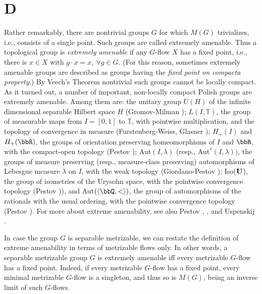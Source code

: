 \section{D}
Rather remarkably, there are nontrivial groups $G$ for which $M(G)$
trivializes, i.e., consists of a single point.  Such groups are called
extremely amenable.  Thus a topological group is {\it extremely
        amenable} if any $G$-flow $X$ has a fixed point, i.e., there is $x\in X$
with $g\cdot x = x,\ \forall g\in G$.  (For this reason, sometimes
extremely amenable groups are described as groups having the {\it fixed
        point on compacta property}.)  By Veech's Theorem nontrivial such
groups cannot be
locally compact.  As it turned out, a number of important, non-locally
compact Polish groups are extremely amenable.  Among them are: the unitary
group $U(H)$ of the infinite dimensional separable Hilbert space $H$
(Gromov-Milman \cite{GroM}); $L(I,\mathbb T )$, the group of measurable maps from $I=
    [0,1]$ to $\mathbb T$, with pointwise multiplication, and the topology of
convergence in measure (Furstenberg-Weiss, Glasner \cite{Gl98}); $H_+(I)$ and
$H_+(\bbR )$, the groups of orientation preserving homeomorphisms of
$I$ and $\bbR$, with the compact-open topology (Pestov \cite{P98a}); Aut$(I,
    \lambda )$ (resp., Aut$^*(I,\lambda ))$, the groups of measure preserving
(resp., measure-class preserving) automorphisms of Lebesgue measure
$\lambda$ on $I$, with the weak topology (Giordano-Pestov \cite{GiP});
Iso($\bf U$), the group of isometries of the Urysohn space, with the
pointwise convergence topology (Pestov \cite{P02})), and Aut$(\langle\bbQ ,
    <\rangle )$, the group of automorphisms of the rationals with the usual
ordering, with the pointwise convergence topology (Pestov \cite{P98a}).  For
more about extreme amenability, see also Pestov \cite{P99},
\cite{P02a}, \cite{P02b} and Uspenskij \cite{Usp02}.

In case the group $G$ is separable metrizable, we can restate the definition
of extreme amenability in terms of metrizable flows only.  In
other words, a separable metrizable group $G$ is extremely amenable iff
every metrizable $G$-flow has a fixed point.  Indeed, if every
metrizable $G$-flow has a fixed point, every minimal metrizable $G$-flow
is a singleton, and thus so is $M(G)$, being an inverse limit of such $G$-flows.
\medskip


